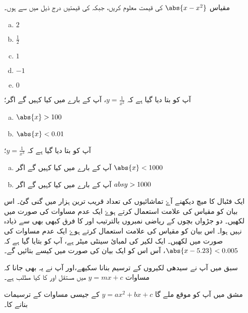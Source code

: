 مقیاس \(\abs{x-x^{2}}\) کی قیمت معلوم کریں، جبکہ کی قیمتیں درج ذیل میں سے ہوں۔
\begin{multicols}{3}
\begin{enumerate}[a.]
\item \( 2 \)
\item \( \frac{1}{2} \)
\item \( 1 \)
\item \( -1 \)
\item \( 0 \)
 \end{enumerate}
\end{multicols}
آپ کو بتا دیا گیا ہے کہ \(y=\frac{1}{x^{2}}\)، آپ  کے بارے میں کیا کہیں گے اگر؛
\begin{multicols}{3}
\begin{enumerate}[a.]
\item \( \abs{x}>100 \)
\item \(\abs{x}<0.01  \)
 \end{enumerate}
\end{multicols}
آپ کو بتا دیا گیا ہے کہ \(y=\frac{1}{x^{3}}\)؛
\begin{multicols}{3}
\begin{enumerate}[a.]
\item 
آپ کے بارے میں کیا کہیں گے اگر \( \abs{x}<1000 \)
\item  
آپ کے بارے میں کیا کہیں گے اگر \( \\abs{y}>1000\)
 \end{enumerate}
\end{multicols}
ایک فٹبال کا میچ دیکھنے آۓ تماشائیوں کی تعداد   قریب ترین ہزار میں گنی گئ۔ اس بیان کو مقیاس کی علامت استعمال کرتے ہوۓ ایک عدم مساوات کی صورت میں لکھیں۔
دو جڑواں بچوں کے ریاضی نمبروں بالترتیب  اور  کا فرق کبھی بھی  سے ذیادہ نہیں ہوا۔ اس بیان کو مقیاس کی علامت استعمال کرتے ہوۓ ایک عدم مساوات کی صورت میں لکھیں۔
ایک لکیر کی لمبائ  سینٹی میٹر ہے، آپ کو بتایا گیا ہے کہ \(\abs{x-5.23}<0.005\)، آس اس کو ایک بیان کی صورت میں کیسے بتائیں گے۔


سبق  میں آپ نے سیدھی لکیروں کے ترسیم بنانا سکیھے،اور آپ نے یہ بھی جانا کہ مساوات \(y=mx+c\) میں مستقل  اور کا کیا مطلب ہے۔ 

مشق  میں آپ کو موقع ملے گا \(y=ax^{2}+bx+c\) کے جیسی مساوات کے ترسیمات بنانے کا۔

